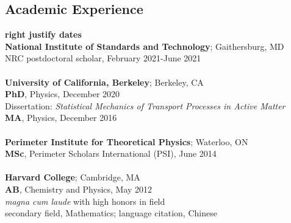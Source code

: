 \documentclass[]{article}
\begin{document}
\subsection*{Academic Experience}
\textbf{\color{red}right justify dates}\\
\textbf{National Institute of Standards and Technology}; Gaithersburg, MD\\
NRC postdoctoral scholar, February 2021-June 2021\\
\\
\textbf{University of California, Berkeley}; Berkeley, CA\\
\textbf{PhD}, Physics, December 2020\\
Dissertation: \textit{Statistical Mechanics of Transport Processes in Active Matter}\\
\textbf{MA}, Physics, December 2016\\
\\
\textbf{Perimeter Institute for Theoretical Physics}; Waterloo, ON\\
\textbf{MSc}, Perimeter Scholars International (PSI), June 2014\\
\\
\textbf{Harvard College}; Cambridge, MA\\
\textbf{AB}, Chemistry and Physics, May 2012\\
\textit{magna cum laude} with high honors in field\\
secondary field, Mathematics; language citation, Chinese




\begin{comment}
\subsection*{Research}
I have worked in two main fields: quantum information and nonequilibrium transport.  In quantum information, I have established speed limits on information processing tasks derived from an extension of the Lieb-Robinson bound to time-dependent local Hamiltonians. More recently, I have demonstrated a connection between a class of nonlinear quantum amplifiers and the von Neumann model of measurement and worked on continuous-time quantum error correction. In 2014, as part of the Perimeter Scholars International masters program, I worked with Daniel Gottesman on magic state distillation. From August 2012-July 2013 I worked in the Quantum Information Group at IBM T.J. Watson research center, where I numerically studied the performance of randomized benchmarking, a method for assessing fidelities of quantum gates.\\
\\
Within nonequilibrium transport, I have focused on the emerging field of active matter. In particular, I have shown how active forces appear in the continuum equations of motion of a system of Active Brownian Particles, and I have derived Green-Kubo equations for generic two-dimensional non-equilibrium fluids, including an expression for the odd viscosity.
\end{comment}
\end{document}
